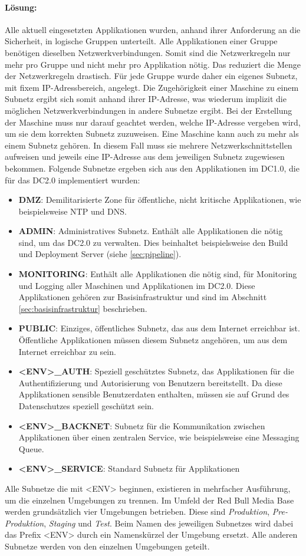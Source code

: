 \paragraph{Lösung:} Alle aktuell eingesetzten Applikationen wurden, anhand ihrer Anforderung an die Sicherheit, in logische Gruppen unterteilt. Alle Applikationen einer Gruppe benötigen dieselben Netzwerkverbindungen. Somit sind die Netzwerkregeln nur mehr pro Gruppe und nicht mehr pro Applikation nötig. Das reduziert die Menge der Netzwerkregeln drastisch. Für jede Gruppe wurde daher ein eigenes Subnetz, mit fixem IP-Adressbereich, angelegt. Die Zugehörigkeit einer Maschine zu einem Subnetz ergibt sich somit anhand ihrer IP-Adresse, was wiederum implizit die möglichen Netzwerkverbindungen in andere Subnetze ergibt. Bei der Erstellung der Maschine muss nur darauf geachtet werden, welche IP-Adresse vergeben wird, um sie dem korrekten Subnetz zuzuweisen. Eine Maschine kann auch zu mehr als einem Subnetz gehören. In diesem Fall muss sie mehrere Netzwerkschnittstellen aufweisen und jeweils eine IP-Adresse aus dem jeweiligen Subnetz zugewiesen bekommen. Folgende Subnetze ergeben sich aus den Applikationen im DC1.0, die für das DC2.0 implementiert wurden:
\begin{itemize}
	\item \textbf{DMZ}: Demilitarisierte Zone für öffentliche, nicht kritische Applikationen, wie beispielsweise NTP und DNS.
	\item \textbf{ADMIN}: Administratives Subnetz. Enthält alle Applikationen die nötig sind, um das DC2.0 zu verwalten. Dies beinhaltet beispielsweise den Build und Deployment Server (siehe \ref{sec:pipeline}).
	\item \textbf{MONITORING}: Enthält alle Applikationen die nötig sind, für Monitoring und Logging aller Maschinen und Applikationen im DC2.0. Diese Applikationen gehören zur Basisinfrastruktur und sind im Abschnitt \ref{sec:basisinfrastruktur} beschrieben.
	\item \textbf{PUBLIC}: Einziges, öffentliches Subnetz, das aus dem Internet erreichbar ist. Öffentliche Applikationen müssen diesem Subnetz angehören, um aus dem Internet erreichbar zu sein.
	\item \textbf{<ENV>\_AUTH}: Speziell geschütztes Subnetz, das Applikationen für die Authentifizierung und Autorisierung von Benutzern bereitstellt. Da diese Applikationen sensible Benutzerdaten enthalten, müssen sie auf Grund des Datenschutzes speziell geschützt sein.
	\item \textbf{<ENV>\_BACKNET}: Subnetz für die Kommunikation zwischen Applikationen über einen zentralen Service, wie beispielsweise eine Messaging Queue.
	\item \textbf{<ENV>\_SERVICE}: Standard Subnetz für Applikationen
\end{itemize}
Alle Subnetze die mit <ENV> beginnen, existieren in mehrfacher Ausführung, um die einzelnen Umgebungen zu trennen. Im Umfeld der Red Bull Media Base werden grundsätzlich vier Umgebungen betrieben. Diese sind \textit{Produktion}, \textit{Pre-Produktion}, \textit{Staging} und \textit{Test}. Beim Namen des jeweiligen Subnetzes wird dabei das Prefix <ENV> durch ein Namenskürzel der Umgebung ersetzt. Alle anderen Subnetze werden von den einzelnen Umgebungen geteilt.

